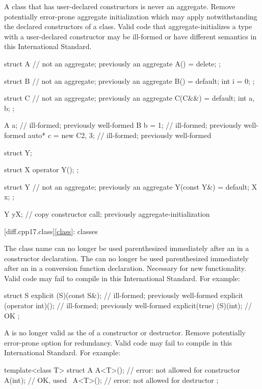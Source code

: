 \change A class that has user-declared constructors is never an aggregate.
\rationale Remove potentially error-prone aggregate initialization
which may apply notwithstanding the declared constructors of a class.
\effect Valid \CppXVII{} code that aggregate-initializes
a type with a user-declared constructor
may be ill-formed or have different semantics
in this International Standard.
\begin{codeblock}
struct A {              // not an aggregate; previously an aggregate
  A() = delete;
};

struct B {              // not an aggregate; previously an aggregate
  B() = default;
  int i = 0;
};

struct C {              // not an aggregate; previously an aggregate
  C(C&&) = default;
  int a, b;
};

A a{};                  // ill-formed; previously well-formed
B b = {1};              // ill-formed; previously well-formed
auto* c = new C{2, 3};  // ill-formed; previously well-formed

struct Y;

struct X {
  operator Y();
};

struct Y {              // not an aggregate; previously an aggregate
  Y(const Y&) = default;
  X x;
};

Y y{X{}};               // copy constructor call; previously aggregate-initialization
\end{codeblock}

[diff.cpp17.class]{\ref{class}: classes}

\change
The class name can no longer be used parenthesized
immediately after an  
in a constructor declaration.
The  can no longer be used parenthesized
immediately after an  
in a conversion function declaration.
\rationale
Necessary for new functionality.
\effect
Valid \CppXVII{} code may fail to compile
in this International Standard. For example:
\begin{codeblock}
struct S {
  explicit (S)(const S&);       // ill-formed; previously well-formed
  explicit (operator int)();    // ill-formed; previously well-formed
  explicit(true) (S)(int);      // OK
};
\end{codeblock}

\change
A 
is no longer valid as the  of a constructor or destructor.
\rationale
Remove potentially error-prone option for redundancy.
\effect
Valid \CppXVII{} code may fail to compile
in this International Standard. For example:
\begin{codeblock}
template<class T>
struct A {
  A<T>();          // error:  not allowed for constructor
  A(int);          // OK,  used
  ~A<T>();         // error:  not allowed for destructor
};
\end{codeblock}

